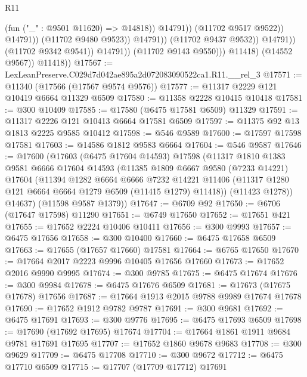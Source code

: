 \begin{lexlean}{R11}
\begin{coremodule}
                                              (fun ("_" : @9501 @11620) => @14818))
                                            @14791))
                                        (@11702 @9517 @9522))
                                      @14791))
                                  (@11702 @9480 @9523))
                                @14791))
                            (@11702 @9437 @9532))
                          @14791))
                      (@11702 @9342 @9541))
                    @14791))
                (@11702 @9143 @9550)))
            @11418)
          (@14552 @9567))
        @11418))
@17567 := LexLeanPreserve.C029d7d042ae895a2d072083090522ca1.R11.__rel_3
@17571 := @11340 (@17566 (@17567 @9574 @9576))
@17577 := @11317 @2229 @121 @10419 @6664 @11329 @6509
@17580 := @11358 @2228 @10415 @10418
@17581 := @300 @10409
@17585 := @17580 (@6475 @17581 @6509) @11329
@17591 := @11317 @2226 @121 @10413 @6664 @17581 @6509
@17597 := @11375 @92 @13 @1813 @2225 @9585 @10412
@17598 := @546 @9589
@17600 := @17597 @17598 @17581
@17603 := @14586 @1812 @9583 @6664
@17604 := @546 @9587
@17646 := @17600
    (@17603
      (@6475 @17604 @14593)
      @17598
      (@11317
        @1810
        @1383
        @9581
        @6666
        @17604
        @14593
        (@11385
          @1809
          @6667
          @9580
          (@7233 @14221)
          @17604
          (@11394
            @1282
            @6664
            @6666
            @7232
            @14221
            @11406
            (@11317 @1280 @121 @6664 @6664 @1279 @6509 (@11415 @1279) @11418))
          (@11423 @1278))
        @14637)
      (@11598 @9587 @1379))
@17647 := @6709 @92
@17650 := @6706 (@17647 @17598) @11290
@17651 := @6749 @17650
@17652 := @17651 @421
@17655 := @17652 @2224 @10406 @10411
@17656 := @300 @9993
@17657 := @6475 @17656
@17658 := @300 @10400
@17660 := @6475 @17658 @6509
@17663 := @17655 (@17657 @17660) @17581
@17664 := @6765 @17650
@17670 := @17664 @2017 @2223 @9996 @10405 @17656 @17660
@17673 := @17652 @2016 @9990 @9995
@17674 := @300 @9785
@17675 := @6475 @17674
@17676 := @300 @9984
@17678 := @6475 @17676 @6509
@17681 := @17673 (@17675 @17678) @17656
@17687 := @17664 @1913 @2015 @9788 @9989 @17674 @17678
@17690 := @17652 @1912 @9782 @9787
@17691 := @300 @9681
@17692 := @6475 @17691
@17693 := @300 @9776
@17695 := @6475 @17693 @6509
@17698 := @17690 (@17692 @17695) @17674
@17704 := @17664 @1861 @1911 @9684 @9781 @17691 @17695
@17707 := @17652 @1860 @9678 @9683
@17708 := @300 @9629
@17709 := @6475 @17708
@17710 := @300 @9672
@17712 := @6475 @17710 @6509
@17715 := @17707 (@17709 @17712) @17691

\end{coremodule}
\end{lexlean}
